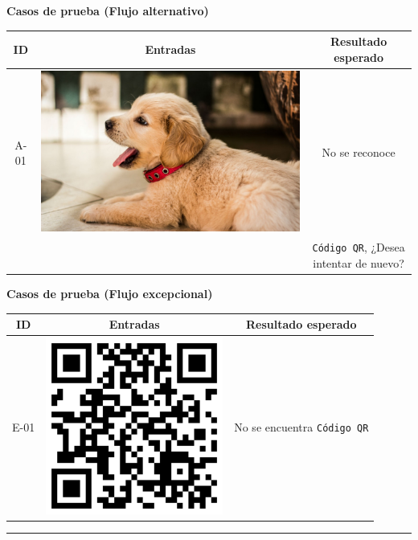 \documentclass{article}
\newcommand{\newsubsection}[1]{
  \indent \textbf{#1}\\
}
\begin{document}
\newsubsection{Casos de prueba (Flujo alternativo)}
\begin{center}
  \begin{tabular}{| c | c | c |}
    \hline
    ID & Entradas & Resultado esperado \\\hline
    A-01 &   \includegraphics[scale=.1]{../imagenes/perrito.jpg} & No se reconoce
    \\
    & & \texttt{Código QR}, ¿Desea intentar de nuevo? \\\hline
  \end{tabular}
\end{center}

\newsubsection{Casos de prueba (Flujo excepcional)}
\begin{center}
  \begin{tabular}{| c | c | c |}
    \hline
    ID & Entradas & Resultado esperado \\\hline
    E-01 &   \includegraphics[scale=.2]{../imagenes/qr.png} & No se encuentra
    \texttt{Código QR} \\\hline
  \end{tabular}
\end{center}
\rule{1\textwidth}{.8pt}\\
\end{document}
